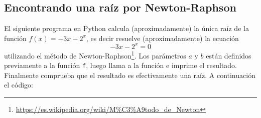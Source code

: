 \documentclass[a4paper,12pt]{article}
\begin{document}
\subsection{Encontrando una raíz por Newton-Raphson}
\label{subsec:codEj2}
El siguiente programa en Python calcula (aproximadamente) la única raíz de la función $f(x) = -3x-2^x$, es decir resuelve (aproximadamente) la ecuación $$ -3x-2^x=0$$ utilizando el método de Newton-Raphson\footnote{\url{https://es.wikipedia.org/wiki/M\%C3\%A9todo_de_Newton}}. Los parámetros $a$ y $b$ están definidos previamente a la función \verb|f|, luego llama a la función e imprime el resultado. Finalmente comprueba que el resultado es efectivamente una raíz. A continuación el código:

%
%	
%	
%	
\end{document}
